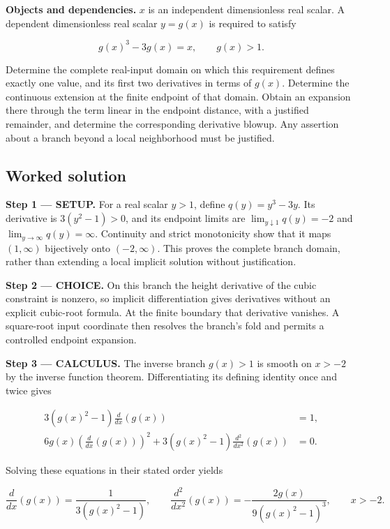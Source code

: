 \documentclass[11pt,oneside,openany]{book}
\begin{document}
\textbf{Objects and dependencies.} \(x\) is an independent dimensionless real scalar. A dependent dimensionless real scalar \(y=g(x)\) is required to satisfy

\[
g(x)^3-3g(x)=x,\qquad g(x)>1.
\]

Determine the complete real-input domain on which this requirement defines exactly one value, and its first two derivatives in terms of \(g(x)\). Determine the continuous extension at the finite endpoint of that domain. Obtain an expansion there through the term linear in the endpoint distance, with a justified remainder, and determine the corresponding derivative blowup. Any assertion about a branch beyond a local neighborhood must be justified.
\subsection*{Worked solution}

\textbf{Step 1 --- SETUP.} For a real scalar \(y>1\), define \(q(y)=y^3-3y\). Its derivative is \(3(y^2-1)>0\), and its endpoint limits are \(\lim_{y\downarrow1}q(y)=-2\) and \(\lim_{y\to\infty}q(y)=\infty\). Continuity and strict monotonicity show that it maps \((1,\infty)\) bijectively onto \((-2,\infty)\). This proves the complete branch domain, rather than extending a local implicit solution without justification.

\begin{ChoiceStep}
\textbf{Step 2 --- CHOICE.} On this branch the height derivative of the cubic constraint is nonzero, so implicit differentiation gives derivatives without an explicit cubic-root formula. At the finite boundary that derivative vanishes. A square-root input coordinate then resolves the branch's fold and permits a controlled endpoint expansion.

\end{ChoiceStep}
\textbf{Step 3 --- CALCULUS.} The inverse branch \(g(x)>1\) is smooth on \(x>-2\) by the inverse function theorem. Differentiating its defining identity once and twice gives

\[
\begin{aligned}
3(g(x)^2-1)\frac{d}{dx}\left(g(x)\right)&=1,\\
6g(x)\left(\frac{d}{dx}\left(g(x)\right)\right)^2
+3(g(x)^2-1)\frac{d^2}{dx^2}\left(g(x)\right)&=0.
\end{aligned}
\]

Solving these equations in their stated order yields

\[
\frac{d}{dx}\left(g(x)\right)=\frac1{3(g(x)^2-1)},
\qquad
\frac{d^2}{dx^2}\left(g(x)\right)=-\frac{2g(x)}{9(g(x)^2-1)^3},\qquad x>-2.
\]
\end{document}
